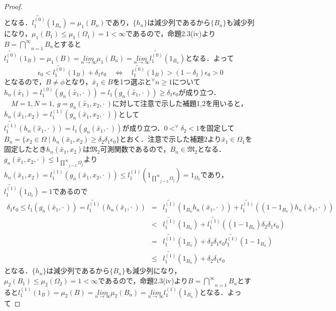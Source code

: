 \documentclass[a4paper,11pt]{jsarticle}
\newtheorem{proof}{証明}
\begin{document}
\begin{proof}
\begin{eqnarray*}
\end{eqnarray*}
となる．$\widetilde{l^{(0)}_1}(1_{B_n})=\mu_1(B_n)$であり，$\{h_n\}$は減少列であるから$\{B_n\}$も減少列になり，$\mu_1(B_1)\leq \mu_1(\Omega_1)=1<\infty$であるので，命題2.3(iv)より$B=\underset{n=1}{\overset{\infty}{\bigcap}}B_n$とすると$\widetilde{l^{(0)}_1}(1_B)=\mu_1(B)=\underset{n\to\infty}{lim}\mu_1(B_n)=\underset{n\to\infty}{lim}\widetilde{l^{(0)}_1}(1_{B_n})$となる．よって
\begin{equation*}
\epsilon_0<\widetilde{l^{(0)}_1}(1_B)+\delta_1\epsilon_0 \quad\Longleftrightarrow\quad \widetilde{l^{(0)}_1}(1_B)>(1-\delta_1)\epsilon_0>0
\end{equation*}
となるので，$B\neq \phi$となり，$\widetilde{x_1}\in B$を1つ選ぶと$^\forall n\geq 1$について$h_n(\widetilde{x_1})=l^{(0)}_1(g_n(\widetilde{x_1},\cdot{\ }))=l_1(g_n(\widetilde{x_1},\cdot{\ }))\geq\delta_1\epsilon_0$が成り立つ．\\
{\ }{\ }$M=1,N=1,{\ }g=g_n(\widetilde{x_1},x_2,\cdot{\ })$に対して注意で示した補題1,2を用いると，$h_n(\widetilde{x_1},x_2)=l^{(1)}_1(g_n(\widetilde{x_1},x_2,\cdot{\ }))$として$\widetilde{l^{(1)}_1}(h_n(\widetilde{x_1},\cdot{\ }))=l_1(g_n(\widetilde{x_1},\cdot{\ }))$が成り立つ．$0< ^\forall \delta_2<1$を固定して$B_n=\{x_2\in\Omega \mid h_n(\widetilde{x_1},x_2)\geq\delta_2\delta_1\epsilon_0\}$とおく．注意で示した$補題2$より$\widetilde{x_1}\in\Omega_1$を固定したとき$h_n(\widetilde{x_1},x_2)$は$\mathfrak{M}_2$可測関数であるので，$B_n\in\mathfrak{M}_2$となる．$g_n(\widetilde{x_1},x_2,\cdot{\ })\leq 1_{\underset{j=2}{\overset{\infty}{\prod}}\Omega_j}$より$h_n(\widetilde{x_1},x_2)=l^{(1)}_1(g_n(\widetilde{x_1},x_2,\cdot{\ }))\leq l^{(1)}_1(1_{\underset{j=2}{\overset{\infty}{\prod}}\Omega_j})=1_{\Omega_2}$であり，$\widetilde{l^{(1)}_1}(1_{\Omega_2})=1$であるので
\begin{eqnarray*}
\delta_1\epsilon_0 \leq l_1(g_n(\widetilde{x_1},\cdot{\ }))=\widetilde{l^{(1)}_1}(h_n(\widetilde{x_1},\cdot{\ }))&=&\widetilde{l^{(1)}_1}(1_{B_n}h_n(\widetilde{x_1},\cdot{\ }))+\widetilde{l^{(1)}_1}((1-1_{B_n})h_n(\widetilde{x_1},\cdot{\ })) \\
&<&\widetilde{l^{(1)}_1}(1_{B_n})+\widetilde{l^{(1)}_1}((1-1_{B_n})\delta_2\delta_1\epsilon_0) \\
&=&\widetilde{l^{(1)}_1}(1_{B_n})+\delta_2\delta_1\epsilon_0\widetilde{l^{(1)}_1}(1-1_{B_n}) \\
&\leq&\widetilde{l^{(1)}_1}(1_{B_n})+\delta_2\delta_1\epsilon_0
\end{eqnarray*}
となる．$\{h_n\}$は減少列であるから$\{B_n\}$も減少列になり，$\mu_2(B_1)\leq \mu_2(\Omega_2)=1<\infty$であるので，命題2.3(iv)より$B=\underset{n=1}{\overset{\infty}{\bigcap}}B_n$とすると$l^{(1)}_1(1_B)=\mu_2(B)=\underset{n\to\infty}{lim}\mu_2(B_n)=\underset{n\to\infty}{lim}l^{(1)}_1(1_{B_n})$となる．よって

\end{proof}
\end{document}
